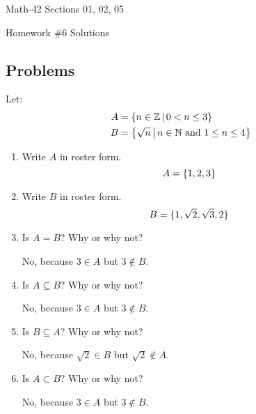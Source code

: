 \documentclass[letterpaper,12pt,fleqn]{article}
\begin{document}
\begin{center}
  \large
  Math-42 Sections 01, 02, 05

  \Large
  Homework \#6 Solutions
\end{center}

\subsection*{Problems}

Let:
\begin{align*}
  A &= \left\{{n\in\mathbb{Z}}\,\middle|\,{0<n\le3}\right\} \\
  B &= \left\{{\sqrt{n}}\,\middle|\,{n\in\mathbb{N}\ \text{and}\ 1\le n\le 4}\right\}
\end{align*}

\begin{enumerate}[left=0in]
\item Write \(A\) in roster form.
  \[A=\{1,2,3\}\]
\item Write \(B\) in roster form.
  \[B=\{1,\sqrt{2},\sqrt{3},2\}\]
\item Is \(A=B\)?  Why or why not?

  \bigskip

  No, because \(3\in A\) but \(3\notin B\).
  
  \bigskip

\item Is \(A\subseteq B\)? Why or why not?

  \bigskip

  No, because \(3\in A\) but \(3\notin B\).

  \bigskip

\item Is \(B\subseteq A\)? Why or why not?

  \bigskip

  No, because \(\sqrt{2}\in B\) but \(\sqrt{2}\notin A\).

  \bigskip

\item Is \(A\subset B\)? Why or why not?

  \bigskip

  No, because \(3\in A\) but \(3\notin B\).

  \bigskip


\end{enumerate}
\end{document}
